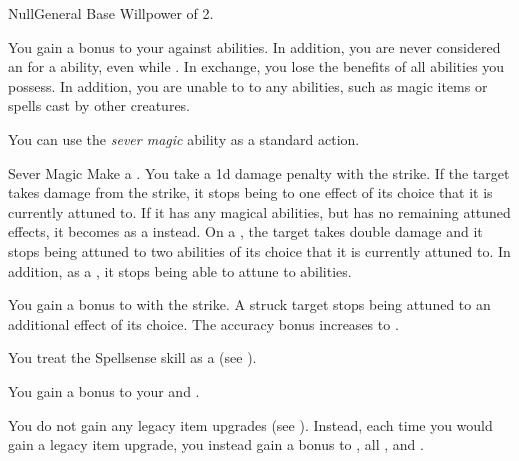     \begin{feat}{Null}{General}
        \featpre Base Willpower of 2.

         You gain a  bonus to your  against  abilities.
        In addition, you are never considered an  for a  ability, even while \unconscious.
        In exchange, you lose the benefits of all  abilities you possess.
        In addition, you are unable to  to any  abilities, such as magic items or spells cast by other creatures.

         You can use the \textit{sever magic} ability as a standard action.
        \begin{freeability}{Sever Magic}
            Make a .
            You take a \minus1d damage penalty with the strike.
            If the target takes damage from the strike, it stops being  to one effect of its choice that it is currently attuned to.
            If it has any magical abilities, but has no remaining attuned effects, it becomes \dazed as a  instead.
            On a , the target takes double damage and it stops being attuned to two abilities of its choice that it is currently attuned to.
            In addition, as a , it stops being able to attune to abilities.

            \rankline
             You gain a  bonus to  with the strike.
             A struck target stops being attuned to an additional effect of its choice.
             The accuracy bonus increases to .
        \end{freeability}

         You treat the Spellsense skill as a  (see ).

         You gain a  bonus to your  and .

         You do not gain any legacy item upgrades (see ).
        Instead, each time you would gain a legacy item upgrade, you instead gain a  bonus to , all , and .


\end{feat}
